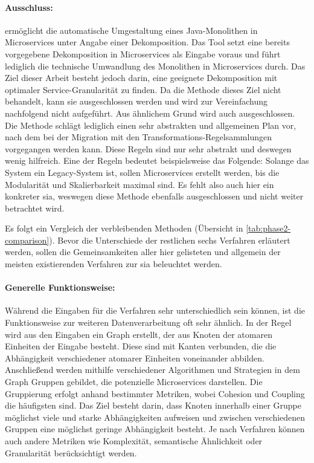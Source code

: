 \paragraph{Ausschluss:}  ermöglicht die automatische Umgestaltung eines Java-Mo\-no\-li\-then in Microservices unter Angabe einer Dekomposition.
Das Tool setzt eine bereits vorgegebene Dekomposition in Microservices als Eingabe voraus und führt lediglich die technische Umwandlung des Monolithen in Microservices durch.
Das Ziel dieser Arbeit besteht jedoch darin, eine geeignete Dekomposition mit optimaler Service-Granularität zu finden.
Da die Methode dieses Ziel nicht behandelt, kann sie ausgeschlossen werden und wird zur Vereinfachung nachfolgend nicht aufgeführt.
Aus ähnlichem Grund wird auch  ausgeschlossen.
Die Methode schlägt lediglich einen sehr abstrakten und allgemeinen Plan vor, nach dem bei der Migration mit den Transformations-Regelsammlungen vorgegangen werden kann.
Diese Regeln sind nur sehr abstrakt und deswegen wenig hilfreich.
Eine der Regeln bedeutet beispielsweise das Folgende:
Solange das System ein Legacy-System ist, sollen Microservices erstellt werden, bis die Modularität und Skalierbarkeit maximal sind.
Es fehlt also auch hier ein konkreter \gls{sia}, weswegen diese Methode ebenfalls ausgeschlossen und nicht weiter betrachtet wird.


Es folgt ein Vergleich der verbleibenden Methoden (Übersicht in \cref{tab:phase2-comparison}).
Bevor die Unterschiede der restlichen sechs Verfahren erläutert werden, sollen die Gemeinsamkeiten aller hier gelisteten und allgemein der meisten existierenden Verfahren zur \gls{sia} beleuchtet werden.



\paragraph{Generelle Funktionsweise:} 
Während die Eingaben für die Verfahren sehr unterschiedlich sein können, ist die Funktionsweise zur weiteren Datenverarbeitung oft sehr ähnlich.
In der Regel wird aus den Eingaben ein Graph erstellt, der aus Knoten der atomaren Einheiten der Eingabe besteht.
Diese sind mit Kanten verbunden, die die Abhängigkeit verschiedener atomarer Einheiten voneinander abbilden.
Anschließend werden mithilfe verschiedener Algorithmen und Strategien in dem Graph Gruppen gebildet, die potenzielle Microservices darstellen.
Die Gruppierung erfolgt anhand bestimmter Metriken, wobei Cohesion und Coupling die häufigsten sind.
Das Ziel besteht darin, dass Knoten innerhalb einer Gruppe möglichst viele und starke Abhängigkeiten aufweisen und zwischen verschiedenen Gruppen eine möglichst geringe Abhängigkeit besteht.
Je nach Verfahren können auch andere Metriken wie Komplexität, semantische Ähnlichkeit oder Granularität berücksichtigt werden.


